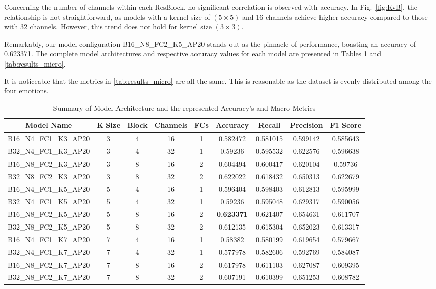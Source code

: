 Concerning the number of channels within each ResBlock, no significant correlation is observed with accuracy. In Fig.~\ref{fig:KvB}, the relationship is not straightforward, as models with a kernel size of $(5\times5)$ and 16 channels achieve higher accuracy compared to those with 32 channels. However, this trend does not hold for kernel size $(3\times3)$.

Remarkably, our model configuration B16{\_}N8{\_}FC2{\_}K5{\_}AP20 stands out as the pinnacle of performance, boasting an accuracy of 0.623371. The complete model architectures and respective accuracy values for each model are presented in Tables \ref{tab:results_macro} and \ref{tab:results_micro}.

It is noticeable that the metrics in \ref{tab:results_micro} are all the same. This is reasonable as the dataset is evenly distributed among the four emotions.
\begin{table}[h]
	\caption{Summary of Model Architecture and the represented Accuracy's and Macro Metrics}
	\begin{tabular}{|c|c|c|c|c|c|c|c|c|}
		\hline
		Model Name & K Size & Block & Channels & FCs & Accuracy & Recall & Precision & F1 Score \\ \hline
		B16\_N4\_FC1\_K3\_AP20 & 3 & 4 & 16 & 1 & 0.582472 & 0.581015 & 0.599142 & 0.585643 \\ \hline
		B32\_N4\_FC1\_K3\_AP20 & 3 & 4 & 32 & 1 & 0.59236  & 0.595532 & 0.622576 & 0.596638 \\ \hline
		B16\_N8\_FC2\_K3\_AP20 & 3 & 8 & 16 & 2 & 0.604494 & 0.600417 & 0.620104 & 0.59736  \\ \hline
		B32\_N8\_FC2\_K3\_AP20 & 3 & 8 & 32 & 2 & 0.622022 & 0.618432 & 0.650313 & 0.622679 \\ \hline
		B16\_N4\_FC1\_K5\_AP20 & 5 & 4 & 16 & 1 & 0.596404 & 0.598403 & 0.612813 & 0.595999 \\ \hline
		B32\_N4\_FC1\_K5\_AP20 & 5 & 4 & 32 & 1 & 0.59236  & 0.595048 & 0.629317 & 0.590056 \\ \hline
		B16\_N8\_FC2\_K5\_AP20 & 5 & 8 & 16 & 2 & \textbf{0.623371} & 0.621407 & 0.654631 & 0.611707 \\ \hline
		B32\_N8\_FC2\_K5\_AP20 & 5 & 8 & 32 & 2 & 0.612135 & 0.615304 & 0.652023 & 0.613317 \\ \hline
		B16\_N4\_FC1\_K7\_AP20 & 7 & 4 & 16 & 1 & 0.58382  & 0.580199 & 0.619654 & 0.579667 \\ \hline
		B32\_N4\_FC1\_K7\_AP20 & 7 & 4 & 32 & 1 & 0.577978 & 0.582606 & 0.592769 & 0.584087 \\ \hline
		B16\_N8\_FC2\_K7\_AP20 & 7 & 8 & 16 & 2 & 0.617978 & 0.611103 & 0.627087 & 0.609395 \\ \hline
		B32\_N8\_FC2\_K7\_AP20 & 7 & 8 & 32 & 2 & 0.607191 & 0.610399 & 0.651253 & 0.608782 \\ \hline
	\end{tabular}
	\label{tab:results_macro}
\end{table}


